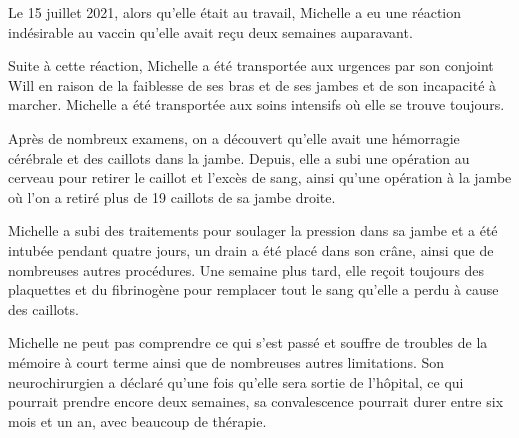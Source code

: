 Le 15 juillet 2021, alors qu'elle était au travail, Michelle a eu une réaction
indésirable au vaccin qu'elle avait reçu deux semaines auparavant.

Suite à cette réaction, Michelle a été transportée aux urgences par son conjoint
Will en raison de la faiblesse de ses bras et de ses jambes et de son incapacité
à marcher. Michelle a été transportée aux soins intensifs où elle se trouve
toujours.

Après de nombreux examens, on a découvert qu'elle avait une hémorragie cérébrale
et des caillots dans la jambe. Depuis, elle a subi une opération au cerveau pour
retirer le caillot et l'excès de sang, ainsi qu'une opération à la jambe où l'on
a retiré plus de 19 caillots de sa jambe droite.

Michelle a subi des traitements pour soulager la pression dans sa jambe et a été
intubée pendant quatre jours, un drain a été placé dans son crâne, ainsi que de
nombreuses autres procédures. Une semaine plus tard, elle reçoit toujours des
plaquettes et du fibrinogène pour remplacer tout le sang qu'elle a perdu à cause
des caillots.

Michelle ne peut pas comprendre ce qui s'est passé et souffre de troubles de la
mémoire à court terme ainsi que de nombreuses autres limitations. Son
neurochirurgien a déclaré qu'une fois qu'elle sera sortie de l'hôpital, ce qui
pourrait prendre encore deux semaines, sa convalescence pourrait durer entre six
mois et un an, avec beaucoup de thérapie.

